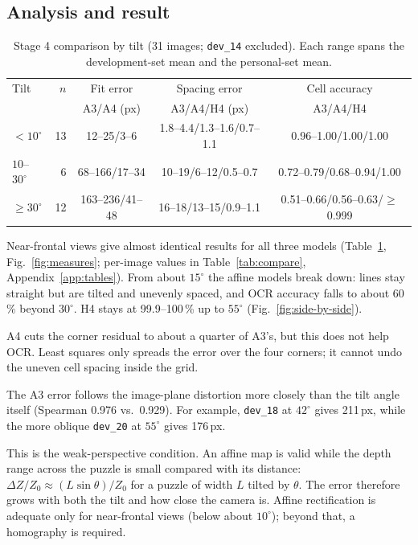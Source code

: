 \documentclass[conference]{IEEEtran}
\begin{document}
\subsection{Analysis and result}
\begin{table}[t]
\centering\footnotesize
\caption{Stage 4 comparison by tilt (31 images; \texttt{dev\_14} excluded). Each range spans the development-set mean and the personal-set mean.}
\label{tab:tilt}
\scriptsize\setlength{\tabcolsep}{1.6pt}
\begin{tabular}{@{}l r c c c@{}}
\toprule
Tilt & $n$ & Fit error & Spacing error & Cell accuracy\\
 & & A3/A4 (px) & A3/A4/H4 (px) & A3/A4/H4\\
\midrule
$<10^\circ$ & 13 & 12--25/3--6 & 1.8--4.4/1.3--1.6/0.7--1.1 & 0.96--1.00/1.00/1.00\\
$10$--$30^\circ$ & 6 & 68--166/17--34 & 10--19/6--12/0.5--0.7 & 0.72--0.79/0.68--0.94/1.00\\
$\geq30^\circ$ & 12 & 163--236/41--48 & 16--18/13--15/0.9--1.1 & 0.51--0.66/0.56--0.63/$\geq$0.999\\
\bottomrule
\end{tabular}
\end{table}

Near-frontal views give almost identical results for all three models (Table~\ref{tab:tilt}, Fig.~\ref{fig:measures}; per-image values in Table~\ref{tab:compare}, Appendix~\ref{app:tables}). From about $15^\circ$ the affine models break down: lines stay straight but are tilted and unevenly spaced, and OCR accuracy falls to about 60\,\% beyond $30^\circ$. H4 stays at 99.9--100\,\% up to $55^\circ$ (Fig.~\ref{fig:side-by-side}).

A4 cuts the corner residual to about a quarter of A3's, but this does not help OCR. Least squares only spreads the error over the four corners; it cannot undo the uneven cell spacing inside the grid.

The A3 error follows the image-plane distortion more closely than the tilt angle itself (Spearman 0.976 vs.\ 0.929). For example, \texttt{dev\_18} at $42^\circ$ gives 211\,px, while the more oblique \texttt{dev\_20} at $55^\circ$ gives 176\,px.

This is the weak-perspective condition. An affine map is valid while the depth range across the puzzle is small compared with its distance: $\Delta Z/Z_0\approx(L\sin\theta)/Z_0$ for a puzzle of width $L$ tilted by $\theta$. The error therefore grows with both the tilt and how close the camera is. Affine rectification is adequate only for near-frontal views (below about $10^\circ$); beyond that, a homography is required.
\end{document}
